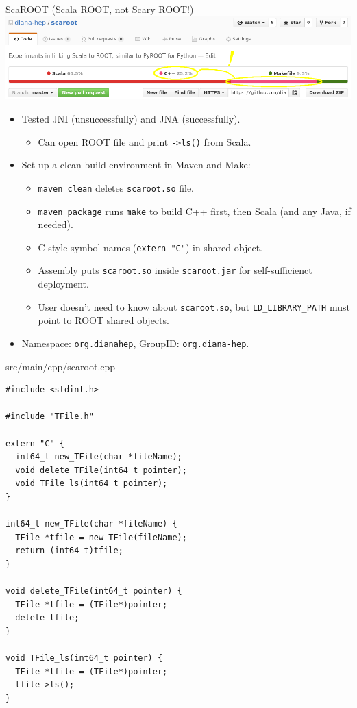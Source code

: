 \documentclass{beamer}
\begin{document}
\begin{frame}{ScaROOT {\small (Scala ROOT, not Scary ROOT!)}}
\includegraphics[width=\linewidth]{scaroot_languages.png}

\vspace{0.2 cm}
\begin{itemize}
\item Tested JNI (unsuccessfully) and JNA (successfully).
\begin{itemize}
\item Can open ROOT file and print {\tt ->ls()} from Scala.
\end{itemize}
\item Set up a clean build environment in Maven and Make:
\begin{itemize}
\item {\tt maven clean} deletes {\tt scaroot.so} file.
\item {\tt maven package} runs {\tt make} to build C++ first, then Scala (and any Java, if needed).
\item C-style symbol names ({\tt extern "C"}) in shared object.
\item Assembly puts {\tt scaroot.so} inside {\tt scaroot.jar} for self-sufficienct deployment.
\item User doesn't need to know about {\tt scaroot.so}, but {\tt LD\_LIBRARY\_PATH} must point to ROOT shared objects.
\end{itemize}
\item Namespace: {\tt org.dianahep}, GroupID: {\tt org.diana-hep}.
\end{itemize}
\end{frame}

\begin{frame}[fragile]{src/main/cpp/scaroot.cpp}
\small
\begin{verbatim}
#include <stdint.h>

#include "TFile.h"

extern "C" {
  int64_t new_TFile(char *fileName);
  void delete_TFile(int64_t pointer);
  void TFile_ls(int64_t pointer);
}

int64_t new_TFile(char *fileName) {
  TFile *tfile = new TFile(fileName);
  return (int64_t)tfile;
}

void delete_TFile(int64_t pointer) {
  TFile *tfile = (TFile*)pointer;
  delete tfile;
}

void TFile_ls(int64_t pointer) {
  TFile *tfile = (TFile*)pointer;
  tfile->ls();
}
\end{verbatim}
\end{frame}
\end{document}
